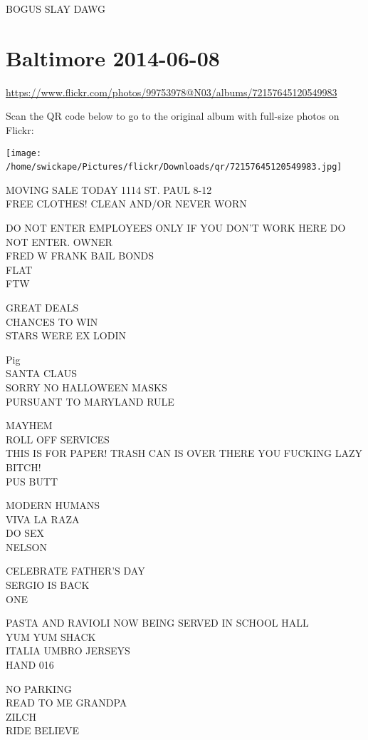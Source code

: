 \documentclass[10pt,letterpaper]{article}
\begin{document}
BOGUS SLAY DAWG
\

\section*{Baltimore 2014-06-08}

\url{https://www.flickr.com/photos/99753978@N03/albums/72157645120549983}

Scan the QR code below to go to the original album with full-size photos on Flickr:

\texttt{[image: /home/swickape/Pictures/flickr/Downloads/qr/72157645120549983.jpg]}
\

MOVING SALE TODAY 1114 ST. PAUL 8{-}12\\
FREE CLOTHES! CLEAN AND/OR NEVER WORN

DO NOT ENTER EMPLOYEES ONLY IF YOU DON'T WORK HERE DO NOT ENTER.  OWNER\\
FRED W FRANK BAIL BONDS\\
FLAT\\
FTW

GREAT DEALS\\
CHANCES TO WIN\\
STARS WERE EX LODIN

Pig\\
SANTA CLAUS\\
SORRY NO HALLOWEEN MASKS\\
PURSUANT TO MARYLAND RULE

MAYHEM\\
ROLL OFF SERVICES\\
THIS IS FOR PAPER!  TRASH CAN IS OVER THERE YOU FUCKING LAZY BITCH!\\
PUS BUTT

MODERN HUMANS\\
VIVA LA RAZA\\
DO SEX\\
NELSON

CELEBRATE FATHER'S DAY\\
SERGIO IS BACK\\
ONE

PASTA AND RAVIOLI NOW BEING SERVED IN SCHOOL HALL\\
YUM YUM SHACK\\
ITALIA UMBRO JERSEYS\\
HAND 016

NO PARKING\\
READ TO ME GRANDPA\\
ZILCH\\
RIDE BELIEVE
\end{document}
